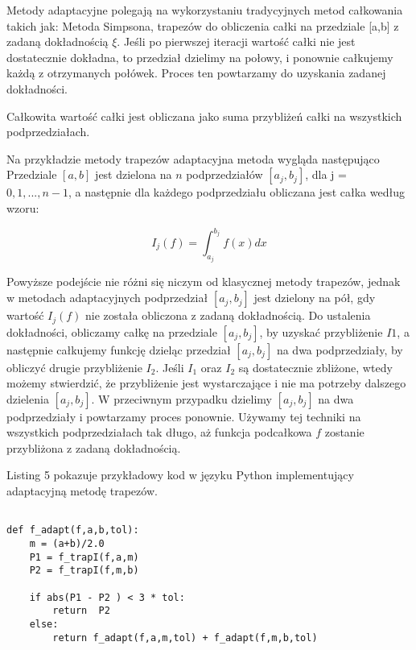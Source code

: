 \documentclass[12pt,twoside]{article}
\begin{document}
Metody adaptacyjne polegają na wykorzystaniu tradycyjnych metod całkowania takich jak: Metoda Simpsona, trapezów do obliczenia całki na przedziale [a,b] z zadaną dokładnością $\xi$. Jeśli po pierwszej iteracji wartość całki nie jest dostatecznie dokładna, to przedział dzielimy na połowy, i ponownie całkujemy każdą z otrzymanych połówek. Proces ten powtarzamy do uzyskania zadanej dokładności.\cite{adaptive2}

Całkowita wartość całki jest obliczana jako suma przybliżeń całki na wszystkich podprzedziałach.

Na przykładzie metody trapezów adaptacyjna metoda wygląda następująco
Przedziale $[a,b]$ jest dzielona na $n$ podprzedziałów $[a_j,b_j]$, dla j = $0,1,...,n-1$, a następnie dla każdego podprzedziału obliczana jest całka według wzoru:

\begin{equation}
I_j(f) = \int_{a_j}^{b_j}f(x) dx
\label{Eq:rownanie}
\end{equation}

Powyższe podejście nie różni się niczym od klasycznej metody trapezów, jednak w metodach adaptacyjnych podprzedział $[a_j,b_j]$ jest dzielony na pół, gdy wartość $I_j(f)$ nie została obliczona z zadaną dokładnością.
Do ustalenia dokładności, obliczamy całkę na przedziale $[a_j,b_j]$, by uzyskać przybliżenie $I1$, a następnie całkujemy funkcję dzieląc przedział $[a_j,b_j]$ na dwa podprzedziały, by obliczyć drugie przybliżenie $I_2$. Jeśli $I_1$ oraz $I_2$ są dostatecznie zbliżone, wtedy możemy stwierdzić, że przybliżenie jest wystarczające i nie ma potrzeby dalszego dzielenia $[a_j,b_j]$. W przeciwnym przypadku dzielimy $[a_j,b_j]$ na dwa podprzedziały i powtarzamy proces ponownie. Używamy tej techniki na wszystkich podprzedziałach tak długo, aż funkcja podcałkowa $f$ zostanie przybliżona z zadaną dokładnością.\cite{adaptive3}

Listing 5 pokazuje przykładowy kod w języku Python implementujący adaptacyjną metodę trapezów.

\begin{lstlisting}[caption={Kod w języku python implementujący metodę simpsona}]

def f_adapt(f,a,b,tol):
    m = (a+b)/2.0
    P1 = f_trapI(f,a,m)
    P2 = f_trapI(f,m,b)

    if abs(P1 - P2 ) < 3 * tol:
        return  P2
    else:
        return f_adapt(f,a,m,tol) + f_adapt(f,m,b,tol)

\end{lstlisting}
\label{Listing 5}
\end{document}

